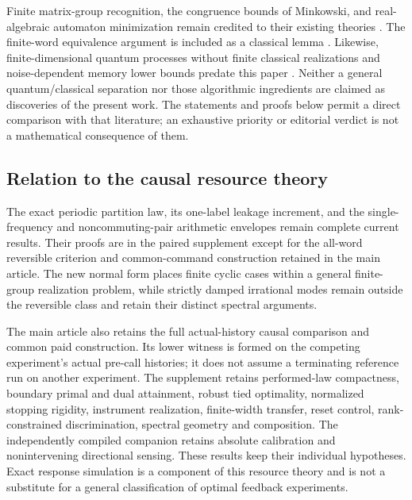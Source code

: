 Finite matrix-group recognition, the congruence bounds of Minkowski, and
real-algebraic automaton minimization remain credited to their existing
theories \cite{Serre07,BabaiBealsRockmore93,KieferWachter14}. The
finite-word equivalence argument is included as a classical lemma
\cite{Tzeng92}. Likewise, finite-dimensional quantum processes without
finite classical realizations and noise-dependent memory lower bounds
predate this paper \cite{Fanizza24}. Neither a general quantum/classical
separation nor those algorithmic ingredients are claimed as discoveries
of the present work. The statements and proofs below permit a direct
comparison with that literature; an exhaustive priority or editorial
verdict is not a mathematical consequence of them.

\subsection*{Relation to the causal resource theory}
The exact periodic partition law, its one-label leakage increment, and
the single-frequency and noncommuting-pair arithmetic envelopes remain
complete current results. Their proofs are in the paired supplement
except for the all-word reversible criterion and common-command
construction retained in the main article. The new normal form places
finite cyclic cases within a general finite-group realization problem,
while strictly damped irrational modes remain outside the reversible
class and retain their distinct spectral arguments.

The main article also retains the full actual-history causal comparison
and common paid construction. Its lower witness is formed on the
competing experiment's actual pre-call histories; it does not assume a
terminating reference run on another experiment. The supplement retains
performed-law compactness, boundary primal and dual attainment, robust
tied optimality, normalized stopping rigidity, instrument realization,
finite-width transfer, reset control, rank-constrained discrimination,
spectral geometry and composition. The independently compiled companion
retains absolute calibration and nonintervening directional sensing.
These results keep their individual hypotheses. Exact response
simulation is a component of this resource theory and is not a substitute
for a general classification of optimal feedback experiments.
